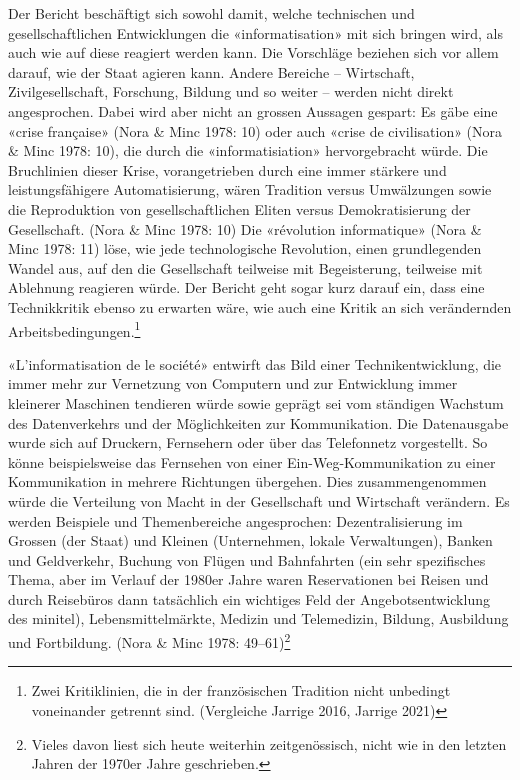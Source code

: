 \documentclass[a4paper,
fontsize=11pt,
oneside,
numbers=noperiodatend,
parskip=half-,
bibliography=totoc,
final
]{scrartcl}
\begin{document}
Der Bericht beschäftigt sich sowohl damit, welche technischen und
gesellschaftlichen Entwicklungen die «informatisation» mit sich bringen
wird, als auch wie auf diese reagiert werden kann. Die Vorschläge
beziehen sich vor allem darauf, wie der Staat agieren kann. Andere
Bereiche -- Wirtschaft, Zivilgesellschaft, Forschung, Bildung und so
weiter -- werden nicht direkt angesprochen. Dabei wird aber nicht an
grossen Aussagen gespart: Es gäbe eine «crise française» (Nora \& Minc
1978: 10) oder auch «crise de civilisation» (Nora \& Minc 1978: 10), die
durch die «informatisiation» hervorgebracht würde. Die Bruchlinien
dieser Krise, vorangetrieben durch eine immer stärkere und
leistungsfähigere Automatisierung, wären Tradition versus Umwälzungen
sowie die Reproduktion von gesellschaftlichen Eliten versus
Demokratisierung der Gesellschaft. (Nora \& Minc 1978: 10) Die
«révolution informatique» (Nora \& Minc 1978: 11) löse, wie jede
technologische Revolution, einen grundlegenden Wandel aus, auf den die
Gesellschaft teilweise mit Begeisterung, teilweise mit Ablehnung
reagieren würde. Der Bericht geht sogar kurz darauf ein, dass eine
Technikkritik ebenso zu erwarten wäre, wie auch eine Kritik an sich
verändernden Arbeitsbedingungen.\footnote{Zwei Kritiklinien, die in der
  französischen Tradition nicht unbedingt voneinander getrennt sind.
  (Vergleiche Jarrige 2016, Jarrige 2021)}

«L'informatisation de le société» entwirft das Bild einer
Technikentwicklung, die immer mehr zur Vernetzung von Computern und zur
Entwicklung immer kleinerer Maschinen tendieren würde sowie geprägt sei
vom ständigen Wachstum des Datenverkehrs und der Möglichkeiten zur
Kommunikation. Die Datenausgabe wurde sich auf Druckern, Fernsehern oder
über das Telefonnetz vorgestellt. So könne beispielsweise das Fernsehen
von einer Ein-Weg-Kommunikation zu einer Kommunikation in mehrere
Richtungen übergehen. Dies zusammengenommen würde die Verteilung von
Macht in der Gesellschaft und Wirtschaft verändern. Es werden Beispiele
und Themenbereiche angesprochen: Dezentralisierung im Grossen (der
Staat) und Kleinen (Unternehmen, lokale Verwaltungen), Banken und
Geldverkehr, Buchung von Flügen und Bahnfahrten (ein sehr spezifisches
Thema, aber im Verlauf der 1980er Jahre waren Reservationen bei Reisen
und durch Reisebüros dann tatsächlich ein wichtiges Feld der
Angebotsentwicklung des minitel), Lebensmittelmärkte, Medizin und
Telemedizin, Bildung, Ausbildung und Fortbildung. (Nora \& Minc 1978:
49--61)\footnote{Vieles davon liest sich heute weiterhin zeitgenössisch,
  nicht wie in den letzten Jahren der 1970er Jahre geschrieben.}
\end{document}
